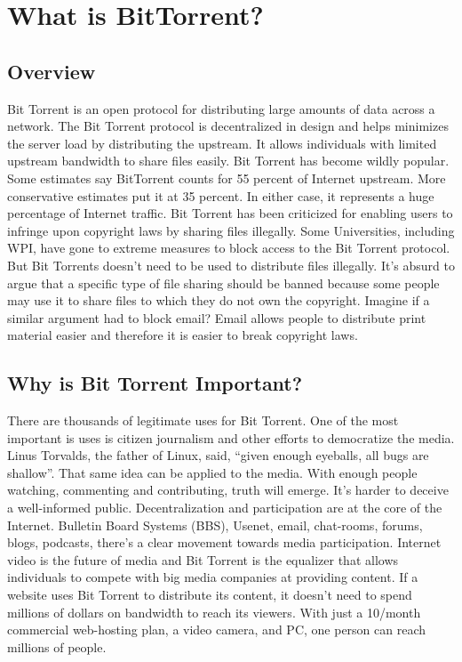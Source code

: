\documentclass[a4paper,12pt]{report}
\begin{document}
\chapter{What is BitTorrent?}

\section{Overview}
Bit Torrent is an open protocol for distributing large amounts of data across a network. The Bit Torrent protocol is decentralized in design and helps minimizes the server load by distributing the upstream. It allows individuals with limited upstream bandwidth to share files easily. 
Bit Torrent has become wildly popular. Some estimates say BitTorrent counts for 55 percent of Internet upstream. More conservative estimates put it at 35 percent. In either case, it represents a huge percentage of Internet traffic.
Bit Torrent has been criticized for enabling users to infringe upon copyright laws by sharing files illegally. Some Universities, including WPI, have gone to extreme measures to block access to the Bit Torrent protocol. But Bit Torrents doesn’t need to be used to distribute files illegally. It’s absurd to argue that a specific type of file sharing should be banned because some people may use it to share files to which they do not own the copyright. Imagine if a similar argument had to block email? Email allows people to distribute print material easier and therefore it is easier to break copyright laws. 

\section{Why is Bit Torrent Important?}
There are thousands of legitimate uses for Bit Torrent. One of the most important is uses is citizen journalism and other efforts to democratize the media. Linus Torvalds, the father of Linux, said, “given enough eyeballs, all bugs are shallow”. That same idea can be applied to the media. With enough people watching, commenting and contributing, truth will emerge. It’s harder to deceive a well-informed public. 
Decentralization and participation are at the core of the Internet. Bulletin Board Systems (BBS), Usenet, email, chat-rooms, forums, blogs, podcasts, there’s a clear movement towards media participation. Internet video is the future of media and Bit Torrent is the equalizer that allows individuals to compete with big media companies at providing content. If a website uses Bit Torrent to distribute its content, it doesn’t need to spend millions of dollars on bandwidth to reach its viewers. With just a 10/month commercial web-hosting plan, a video camera, and PC, one person can reach millions of people.
\end{document}
